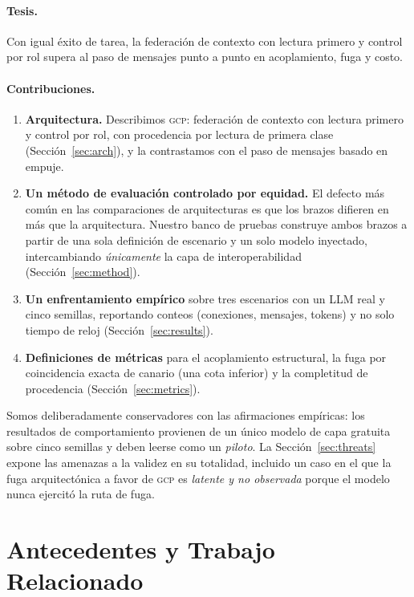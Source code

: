 \documentclass[10pt,twocolumn,letterpaper]{article}
\newcommand{\gcp}{\textsc{gcp}}
\begin{document}
\paragraph{Tesis.} Con igual éxito de tarea, la federación de contexto con
lectura primero y control por rol supera al paso de mensajes punto a punto en
acoplamiento, fuga y costo.

\paragraph{Contribuciones.}
\begin{enumerate}
  \item \textbf{Arquitectura.} Describimos \gcp{}: federación de contexto con
  lectura primero y control por rol, con procedencia por lectura de primera clase
  (Sección~\ref{sec:arch}), y la contrastamos con el paso de mensajes basado en
  empuje.
  \item \textbf{Un método de evaluación controlado por equidad.} El defecto más
  común en las comparaciones de arquitecturas es que los brazos difieren en más
  que la arquitectura. Nuestro banco de pruebas construye ambos brazos a partir de
  una sola definición de escenario y un solo modelo inyectado, intercambiando
  \emph{únicamente} la capa de interoperabilidad (Sección~\ref{sec:method}).
  \item \textbf{Un enfrentamiento empírico} sobre tres escenarios con un LLM real
  y cinco semillas, reportando conteos (conexiones, mensajes, tokens) y no solo
  tiempo de reloj (Sección~\ref{sec:results}).
  \item \textbf{Definiciones de métricas} para el acoplamiento estructural, la
  fuga por coincidencia exacta de canario (una cota inferior) y la completitud de
  procedencia (Sección~\ref{sec:metrics}).
\end{enumerate}

Somos deliberadamente conservadores con las afirmaciones empíricas: los
resultados de comportamiento provienen de un único modelo de capa gratuita sobre
cinco semillas y deben leerse como un \emph{piloto}. La
Sección~\ref{sec:threats} expone las amenazas a la validez en su totalidad,
incluido un caso en el que la fuga arquitectónica a favor de \gcp{} es
\emph{latente y no observada} porque el modelo nunca ejercitó la ruta de fuga.

\section{Antecedentes y Trabajo Relacionado}
\label{sec:related}
\end{document}
